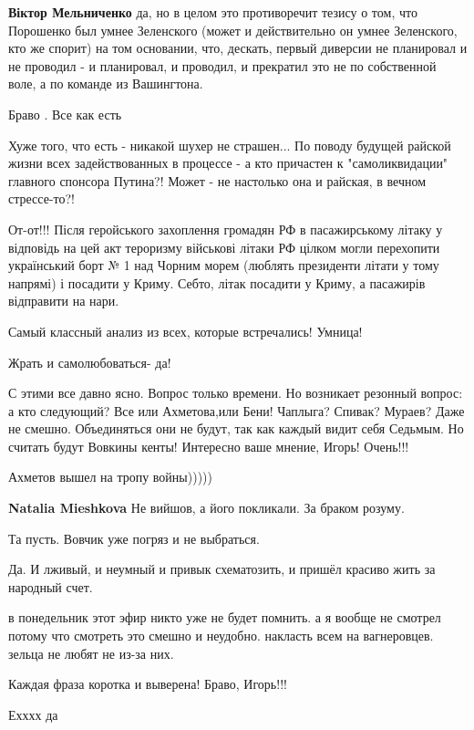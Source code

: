 \begin{itemize}
\begin{itemize}
\textbf{Віктор Мельниченко} да, но в целом это противоречит тезису о том, что Порошенко был умнее Зеленского (может и действительно он умнее Зеленского, кто же спорит) на том основании, что, дескать, первый диверсии не планировал и не проводил - и планировал, и проводил, и прекратил это не по собственной воле, а по команде из Вашингтона.
\end{itemize} %

Браво . Все как есть

Хуже того, что есть - никакой шухер не страшен...
По поводу будущей райской жизни всех задействованных в процессе - а кто причастен к "самоликвидации" главного спонсора Путина?! Может - не настолько она и райская, в вечном стрессе-то?!


От-от!!! Після геройського захоплення громадян РФ в пасажирському літаку у
відповідь на цей акт тероризму військові літаки РФ цілком могли перехопити
український борт № 1 над Чорним морем (люблять президенти літати у тому
напрямі) і посадити у Криму. Себто, літак посадити у Криму, а пасажирів
відправити на нари.


Самый классный анализ из всех, которые встречались!
Умница!

Жрать и самолюбоваться- да!


С этими все давно ясно. Вопрос только времени. Но возникает резонный вопрос: а
кто следующий? Все или Ахметова,или Бени! Чаплыга? Спивак? Мураев? Даже не
смешно. Объединяться они не будут, так как каждый видит себя Седьмым. Но
считать будут Вовкины кенты! Интересно ваше мнение, Игорь! Очень!!!


Ахметов вышел на тропу войны)))))

\begin{itemize} %
\textbf{Natalia Mieshkova} Не вийшов, а його покликали. За браком розуму.
\end{itemize} %

Та пусть. Вовчик уже погряз и не выбраться.

Да. И лживый, и неумный и привык схематозить, и пришёл красиво жить за народный счет.

в понедельник этот эфир никто уже не будет помнить. а я вообще не смотрел потому что смотреть это смешно и неудобно. накласть всем на вагнеровцев. зельца не любят не из-за них.

Каждая фраза коротка и выверена! Браво, Игорь!!!

Ехххх да


\end{itemize} %
